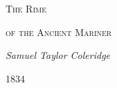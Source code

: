 \documentclass[11pt,twoside]{book}
\begin{document}
\thispagestyle{empty}

\begin{center}
\vspace*{3in}

{\Large\scshape The Rime}

\vspace{0.15in}

{\Large\scshape of the Ancient Mariner}

\vspace{1.5in}

{\normalsize\itshape Samuel Taylor Coleridge}

\vspace{0.5in}

{\footnotesize 1834}

\end{center}

\clearpage

\thispagestyle{empty}
\mbox{}

\clearpage
\end{document}
